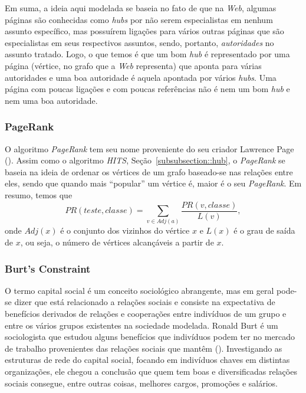 Em suma, a ideia aqui modelada se baseia no fato de que na \textit{Web}, algumas páginas são conhecidas como \textit{hubs} por não serem especialistas em nenhum assunto específico, mas possuírem ligações para vários outras páginas que são especialistas em seus respectivos assuntos, sendo, portanto, \textit{autoridades} no assunto tratado. Logo, o que temos é que um bom \textit{hub} é representado por uma página (vértice, no grafo que a \textit{Web} representa) que aponta para várias autoridades e uma boa autoridade é aquela apontada por vários \textit{hubs}. Uma página com poucas ligações e com poucas referências não é nem um bom \textit{hub} e nem uma boa autoridade.

\subsubsection{PageRank}
\label{subsubsection::pagerank}

O algoritmo \textit{PageRank} tem seu nome proveniente do seu criador Lawrence Page (\cite{Page98}). Assim como o algoritmo \textit{HITS}, Seção~\ref{subsubsection::hub}, o \textit{PageRank} se baseia na ideia de ordenar os vértices de um grafo baseado-se nas relações entre eles, sendo que quando mais ``popular'' um vértice é, maior é o seu \textit{PageRank}. Em resumo, temos que
\begin{equation}\label{eqn::pagerank}
PR(teste, classe) = \sum_{v \in Adj(a)} \frac{PR(v, classe)}{L(v)},
\end{equation}
onde $Adj(x)$ é o conjunto dos vizinhos do vértice $x$ e $L(x)$ é o grau de saída de $x$, ou seja, o número de vértices alcançáveis a partir de $x$.

\subsubsection{Burt's Constraint}
\label{subsubsection::constraint}

O termo capital social é um conceito sociológico abrangente, mas em geral pode-se dizer que está relacionado a relações sociais e consiste na expectativa de benefícios derivados de relações e cooperações entre indivíduos de um grupo e entre os vários grupos existentes na sociedade modelada. Ronald Burt é um sociologista que estudou alguns benefícios que indivíduos podem ter no mercado de trabalho provenientes das relações sociais que mantêm (\cite{Burt92}). Investigando as estruturas de rede do capital social, focando em indivíduos chaves em distintas organizações, ele chegou a conclusão que quem tem boas e diversificadas relações sociais consegue, entre outras coisas, melhores cargos, promoções e salários.  

